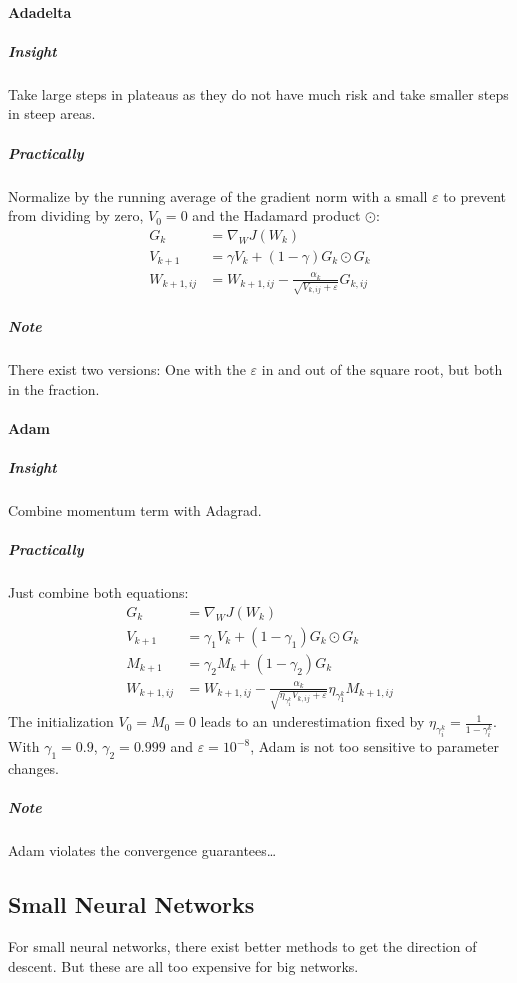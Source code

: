 \documentclass[a4paper, 11pt, accentcolor = tud3b]{tudreport}
\begin{document}
				\paragraph{Adadelta}
					\subparagraph{Insight}
					Take large steps in plateaus as they do not have much risk and take smaller steps in steep areas.
					
					\subparagraph{Practically}
					Normalize by the running average of the gradient norm with a small \(\varepsilon\) to prevent from dividing by zero, \( V_0 = 0 \) and the Hadamard product \( \odot \):
					\begin{align}
						G_k &= \nabla_W J(W_k) \\
						V_{k + 1} &= \gamma V_k + (1 - \gamma) G_k \odot G_k \\
						W_{k + 1, ij} &= W_{k + 1, ij} - \frac{\alpha_k}{\sqrt{V_{k, ij} + \varepsilon}} G_{k, ij}
					\end{align}
					
					\subparagraph{Note}
					There exist two versions: One with the \(\varepsilon\) in and out of the square root, but both in the fraction.

				\paragraph{Adam}
					\subparagraph{Insight}
					Combine momentum term with Adagrad.
					
					\subparagraph{Practically}
					Just combine both equations:
					\begin{align}
						G_k &= \nabla_W J(W_k) \\
						V_{k + 1} &= \gamma_1 V_k + (1 - \gamma_1) G_k \odot G_k \\
						M_{k + 1} &= \gamma_2 M_k + (1 - \gamma_2) G_k \\
						W_{k + 1, ij} &= W_{k + 1, ij} - \frac{\alpha_k}{\sqrt{\eta_{\gamma_1^k} V_{k, ij} + \varepsilon}} \eta_{\gamma_1^k} M_{k + 1, ij}
					\end{align}
					The initialization \( V_0 = M_0 = 0 \) leads to an underestimation fixed by \( \eta_{\gamma_i^k} = \frac{1}{1 - \gamma_i^k} \). With \( \gamma_1 = 0.9 \), \( \gamma_2 = 0.999 \) and \( \varepsilon = 10^{-8} \), Adam is not too sensitive to parameter changes.
					
					\subparagraph{Note}
					Adam violates the convergence guarantees\dots

			\subsection{Small Neural Networks}
				For small neural networks, there exist better methods to get the direction of descent. But these are all too expensive for big networks.
\end{document}
